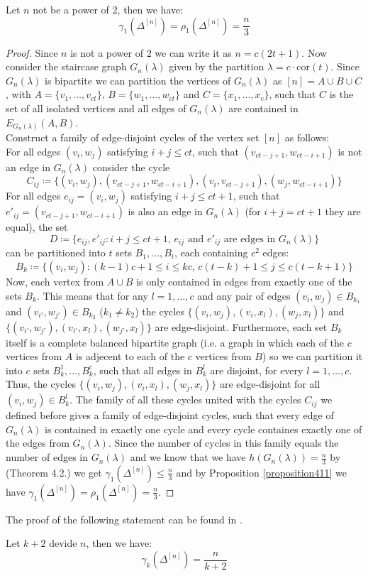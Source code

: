 \begin{thm}
Let $n$ not be a power of $2$, then we have:
\[
\gamma_1(\Delta^{[n]})=\rho_1(\Delta^{[n]})=\frac{n}{3}
\] 
\begin{proof}
Since $n$ is not a power of $2$ we can write it as $n=c(2t+1)$. Now consider the staircase graph $G_n(\lambda)$ given by the partition $\lambda=c\cdot\text{cor}(t)$. Since $G_n(\lambda)$ is bipartite we can partition the vertices of $G_n(\lambda)$ as $[n]=A\cup B\cup C$, with $A=\{v_1,\ldots,v_{ct}\}$, $B=\{w_1,\ldots,w_{ct}\}$ and $C=\{x_1,\ldots,x_c\}$, such that $C$ is the set of all isolated vertices and all edges of $G_n(\lambda)$ are contained in $E_{G_n(\lambda)}(A,B)$.\\
Construct a family of edge-disjoint cycles of the vertex set $[n]$ as follows:\\
For all edges $(v_i,w_j)$ satisfying $i+j\leq ct$, such that $(v_{ct-j+1},w_{ct-i+1})$ is not an edge in $G_n(\lambda)$ consider the cycle
\[
C_{ij}\coloneqq\{(v_i,w_j),(v_{ct-j+1},w_{ct-i+1}),(v_i,v_{ct-j+1}),(w_j,w_{ct-i+1})\}
\]
For all edges $e_{ij}=(v_i,w_j)$ satisfying $i+j\leq ct+1$, such that $e'_{ij}=(v_{ct-j+1},w_{ct-i+1})$ is also an edge in $G_n(\lambda)$ (for $i+j=ct+1$ they are equal), the set
\[
D\coloneqq\{e_{ij}, e'_{ij}:i+j\leq ct+1\text{, }e_{ij}\text{ and }e'_{ij}\text{ are edges in }G_n(\lambda)\}
\] can be partitioned into $t$ sets $B_1,\ldots,B_t$, each containing $c^2$ edges:
\[
B_k\coloneqq\{(v_i,w_j):(k-1)c+1\leq i\leq kc\text{, }c(t-k)+1\leq j\leq c(t-k+1)\}
\]
Now, each vertex from $A\cup B$ is only contained in edges from exactly one of the sets $B_k$. This means that for any $l=1,\ldots,c$ and any pair of edges $(v_i,w_j)\in B_{k_1}$ and $(v_{i'},w_{j'})\in B_{k_2}$ ($k_1\neq k_2$) the cycles $\{(v_i,w_j),(v_i,x_l),(w_j,x_l)\}$ and $\{(v_{i'},w_{j'}),(v_{i'},x_l),(w_{j'},x_l)\}$ are edge-disjoint. Furthermore, each set $B_k$ itself is a complete balanced bipartite graph (i.e. a graph in which each of the $c$ vertices from $A$ is adjecent to each of the $c$ vertices from $B$) so we can partition it into $c$ sets $B_k^1,\ldots,B_k^c$, such that all edges in $B_k^l$ are disjoint, for every $l=1,\ldots,c$. Thus, the cycles $\{(v_i,w_j),(v_i,x_l),(w_j,x_l)\}$ are edge-disjoint for all $(v_i,w_j)\in B_k^l$. The family of all these cycles united with the cycles $C_{ij}$ we defined before gives a family of edge-disjoint cycles, such that every edge of $G_n(\lambda)$ is contained in exactly one cycle and every cycle containes exactly one of the edges from $G_n(\lambda)$. Since the number of cycles in this family equals the number of edges in $G_n(\lambda)$ and we know that we have $h(G_n(\lambda))=\frac{n}{3}$ by \cite{1} (Theorem 4.2.) we get $\gamma_1(\Delta^{[n]})\leq\frac{n}{3}$ and by Proposition \ref{proposition411} we have $\gamma_1(\Delta^{[n]})=\rho_1(\Delta^{[n]})=\frac{n}{3}$.
\end{proof}
\end{thm}

The proof of the following statement can be found in \cite{6}.

\begin{thm}
Let $k+2$ devide $n$, then we have:
\[
\gamma_k(\Delta^{[n]})=\frac{n}{k+2}
\]
\end{thm}
